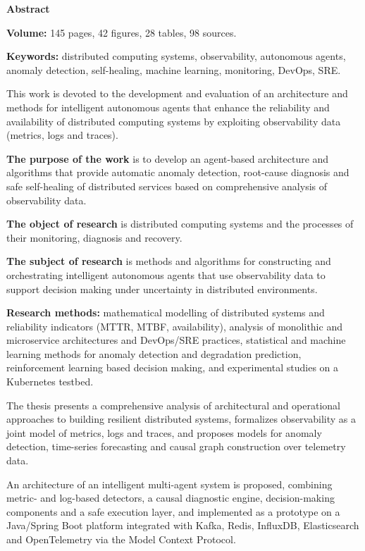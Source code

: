 \textbf{Abstract}

\textbf{Volume:} 145 pages, 42 figures, 28 tables, 98 sources.

\textbf{Keywords:} distributed computing systems, observability, autonomous agents, anomaly detection, self-healing, machine learning, monitoring, DevOps, SRE.

\vspace{1cm}

This work is devoted to the development and evaluation of an architecture and methods for intelligent autonomous agents that enhance the reliability and availability of distributed computing systems by exploiting observability data (metrics, logs and traces).

\textbf{The purpose of the work} is to develop an agent-based architecture and algorithms that provide automatic anomaly detection, root-cause diagnosis and safe self-healing of distributed services based on comprehensive analysis of observability data.

\textbf{The object of research} is distributed computing systems and the processes of their monitoring, diagnosis and recovery.

\textbf{The subject of research} is methods and algorithms for constructing and orchestrating intelligent autonomous agents that use observability data to support decision making under uncertainty in distributed environments.

\textbf{Research methods:} mathematical modelling of distributed systems and reliability indicators (MTTR, MTBF, availability), analysis of monolithic and microservice architectures and DevOps/SRE practices, statistical and machine learning methods for anomaly detection and degradation prediction, reinforcement learning based decision making, and experimental studies on a Kubernetes testbed.

The thesis presents a comprehensive analysis of architectural and operational approaches to building resilient distributed systems, formalizes observability as a joint model of metrics, logs and traces, and proposes models for anomaly detection, time-series forecasting and causal graph construction over telemetry data.

An architecture of an intelligent multi-agent system is proposed, combining metric- and log-based detectors, a causal diagnostic engine, decision-making components and a safe execution layer, and implemented as a prototype on a Java/Spring Boot platform integrated with Kafka, Redis, InfluxDB, Elasticsearch and OpenTelemetry via the Model Context Protocol.

